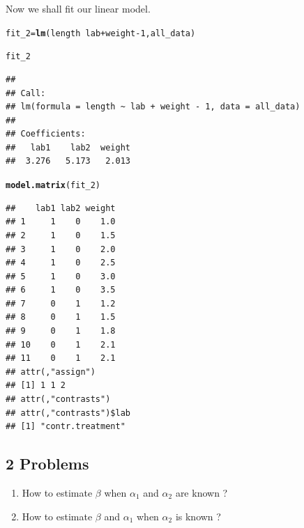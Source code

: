 \documentclass[11pt, a4paper]{article}\usepackage[]{graphicx}\usepackage[]{xcolor}
\makeatletter
\newcommand{\hlnum}[1]{\textcolor[rgb]{0.686,0.059,0.569}{#1}}%
\newcommand{\hlopt}[1]{\textcolor[rgb]{0,0,0}{#1}}%
\newcommand{\hlstd}[1]{\textcolor[rgb]{0.345,0.345,0.345}{#1}}%
\newcommand{\hlkwb}[1]{\textcolor[rgb]{0.69,0.353,0.396}{#1}}%
\newcommand{\hlkwd}[1]{\textcolor[rgb]{0.737,0.353,0.396}{\textbf{#1}}}%
\newenvironment{kframe}{%
 \def\at@end@of@kframe{}%
 \ifinner\ifhmode%
  \def\at@end@of@kframe{\end{minipage}}%
  \begin{minipage}{\columnwidth}%
 \fi\fi%
 \def\FrameCommand##1{\hskip\@totalleftmargin \hskip-\fboxsep
 \colorbox{shadecolor}{##1}\hskip-\fboxsep
     \hskip-\linewidth \hskip-\@totalleftmargin \hskip\columnwidth}%
 \MakeFramed {\advance\hsize-\width
   \@totalleftmargin\z@ \linewidth\hsize
   \@setminipage}}%
 {\par\unskip\endMakeFramed%
 \at@end@of@kframe}
\newenvironment{knitrout}{}{} %
\makeatother
\begin{document}
Now we shall fit our linear model.

\begin{knitrout}
\color{fgcolor}\begin{kframe}
\begin{alltt}
\hlstd{fit_2} \hlkwb{=} \hlkwd{lm}\hlstd{(length} \hlopt{~} \hlstd{lab} \hlopt{+} \hlstd{weight} \hlopt{-} \hlnum{1}\hlstd{, all_data)}
\end{alltt}
\end{kframe}
\end{knitrout}

\begin{knitrout}
\color{fgcolor}\begin{kframe}
\begin{alltt}
\hlstd{fit_2}
\end{alltt}
\begin{verbatim}
## 
## Call:
## lm(formula = length ~ lab + weight - 1, data = all_data)
## 
## Coefficients:
##   lab1    lab2  weight  
##  3.276   5.173   2.013
\end{verbatim}
\end{kframe}
\end{knitrout}

\begin{knitrout}
\color{fgcolor}\begin{kframe}
\begin{alltt}
\hlkwd{model.matrix}\hlstd{(fit_2)}
\end{alltt}
\begin{verbatim}
##    lab1 lab2 weight
## 1     1    0    1.0
## 2     1    0    1.5
## 3     1    0    2.0
## 4     1    0    2.5
## 5     1    0    3.0
## 6     1    0    3.5
## 7     0    1    1.2
## 8     0    1    1.5
## 9     0    1    1.8
## 10    0    1    2.1
## 11    0    1    2.1
## attr(,"assign")
## [1] 1 1 2
## attr(,"contrasts")
## attr(,"contrasts")$lab
## [1] "contr.treatment"
\end{verbatim}
\end{kframe}
\end{knitrout}

\subsection*{2 Problems}

\begin{enumerate}

\item How to estimate $\beta$ when $\alpha_1$ and $\alpha_2$ are known ?
\item How to estimate $\beta$ and $\alpha_1$ when $\alpha_2$ is known ?

\end{enumerate}
\end{document}
